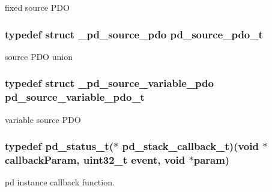 fixed source P\-D\-O 

\hypertarget{group__usb__pd__stack_gae3adfd5239231ab405b04bef0ae1df5a}{
\subsubsection[{pd\-\_\-source\-\_\-pdo\-\_\-t}]{\setlength{\rightskip}{0pt plus 5cm}typedef struct {\bf \-\_\-pd\-\_\-source\-\_\-pdo}  {\bf pd\-\_\-source\-\_\-pdo\-\_\-t}}}\label{group__usb__pd__stack_gae3adfd5239231ab405b04bef0ae1df5a}


source P\-D\-O union 

\hypertarget{group__usb__pd__stack_ga0c9d6847951d8b95ecfac843574c027d}{
\subsubsection[{pd\-\_\-source\-\_\-variable\-\_\-pdo\-\_\-t}]{\setlength{\rightskip}{0pt plus 5cm}typedef struct {\bf \-\_\-pd\-\_\-source\-\_\-variable\-\_\-pdo}  {\bf pd\-\_\-source\-\_\-variable\-\_\-pdo\-\_\-t}}}\label{group__usb__pd__stack_ga0c9d6847951d8b95ecfac843574c027d}


variable source P\-D\-O 

\hypertarget{group__usb__pd__stack_ga270b6a571db4fa308a1cce3df32f5439}{
\subsubsection[{pd\-\_\-stack\-\_\-callback\-\_\-t}]{\setlength{\rightskip}{0pt plus 5cm}typedef {\bf pd\-\_\-status\-\_\-t}($\ast$ pd\-\_\-stack\-\_\-callback\-\_\-t)(void $\ast$callback\-Param, uint32\-\_\-t event, void $\ast$param)}}\label{group__usb__pd__stack_ga270b6a571db4fa308a1cce3df32f5439}


pd instance callback function. 

